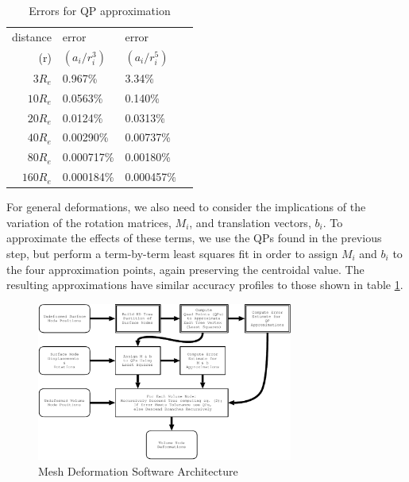\begin{table}[htbp]
\caption{Errors for QP approximation}
\label{tab:error}
\begin{center}
\begin{tabular}{|r||l|l|l|}
\hline
distance  & error         & error \\
(r)       & $(a_i/r_i^3)$  & $(a_i/r_i^5)$ \\
\hline\hline
$3 R_e$   & 0.967\%       & 3.34\%\\
$10 R_e$  & 0.0563\%      & 0.140\%\\
$20 R_e$  & 0.0124\%      & 0.0313\%\\
$40 R_e$  & 0.00290\%     & 0.00737\%\\
$80 R_e$  & 0.000717\%    & 0.00180\%\\
$160 R_e$ & 0.000184\%    & 0.000457\%\\
\hline
\end{tabular}
\end{center}
\end{table}

For general deformations, we also need to consider the implications of
the variation of the rotation matrices, $M_i$, and translation
vectors, $b_i$.  To approximate the effects of these terms, we use the
QPs found in the previous step, but perform a term-by-term least
squares fit in order to assign $M_i$ and $b_i$ to the four
approximation points, again preserving the centroidal value.  The
resulting approximations have similar accuracy profiles to those shown
in table \ref{tab:error}.

\begin{figure}
  \begin{center}
    \noindent
    \includegraphics[width=0.75\textwidth]{Figures/fmdmflow}
  \end{center}
  \protect\caption{Mesh Deformation Software Architecture}
  \label{fig:architecture}
\end{figure}

